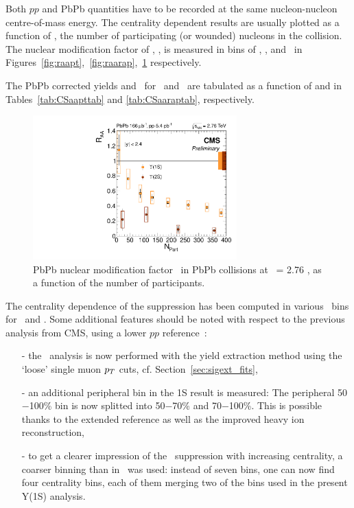 Both $pp$ and PbPb quantities have to be recorded at the same
nucleon-nucleon centre-of-mass energy. The centrality dependent results
are usually plotted as a function of \Npart, the number of participating (or wounded)
nucleons in the collision. 
The nuclear modification factor of \PgUa, \PgUb, is measured in bins
of \pt, \y, and \Npart\ in
Figures~\ref{fig:raapt},~\ref{fig:raarap},~\ref{fig:RAAnpart}
respectively.

The PbPb corrected yields and \RAA\ for \PgUa\ and \PgUb\ are tabulated as a function of \pt and \y in Tables~\ref{tab:CSaapttab} and \ref{tab:CSaaraptab}, respectively.

\begin{figure}[h]
  \begin{centering}  
    \includegraphics[width=0.7\textwidth]{Chapters/aUpsilon/RAA_nPart_4bins-1.pdf}
    \caption{PbPb nuclear modification factor \RAA\ in PbPb collisions
      at \snn\ = 2.76 \TeV, as a function of the number of participants.}
    \label{fig:RAAnpart}
  \end{centering}  
\end{figure}

The centrality dependence of the suppression has been computed
in various \Npart\ bins for \PgUa\ and \PgUb. Some additional
features should be noted with respect to the previous analysis from
CMS, using a lower $pp$ reference~\cite{11-011}:
\begin{itemize}
\item[-]{the \PgUa\ analysis is now performed with the yield extraction
    method using the `loose' single muon $p_{T}$ cuts, cf. Section~\ref{sec:sigext_fits},} %
\item[-]{an additional peripheral bin in the 1S result is measured: The
    peripheral 50$-$100\% bin is now splitted into 50$-$70\% and
    70$-$100\%. This is possible thanks to the extended reference as well
    as the improved heavy ion reconstruction,}
\item[-]{to get a clearer impression of the \PgUb\ suppression with
  increasing centrality, a coarser binning than in~\cite{11-011} was
  used: instead of seven bins, one can now find four
  centrality bins, each of them merging two of the bins used in the present Y(1S) analysis.}
\end{itemize}

